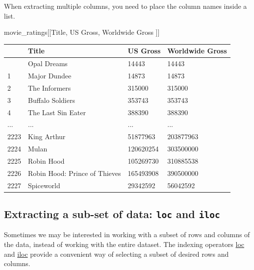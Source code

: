 \documentclass[
  letterpaper,
  DIV=11,
  numbers=noendperiod]{scrreprt}
\newenvironment{Shaded}{\begin{snugshade}}{\end{snugshade}}
\newcommand{\NormalTok}[1]{\textcolor[rgb]{0.00,0.23,0.31}{#1}}
\newcommand{\StringTok}[1]{\textcolor[rgb]{0.13,0.47,0.30}{#1}}
\begin{document}
When extracting multiple columns, you need to place the column names
inside a list.

\begin{Shaded}
\begin{Highlighting}[]
\NormalTok{movie\_ratings[[}\StringTok{\textquotesingle{}Title\textquotesingle{}}\NormalTok{, }\StringTok{\textquotesingle{}US Gross\textquotesingle{}}\NormalTok{, }\StringTok{\textquotesingle{}Worldwide Gross\textquotesingle{}}\NormalTok{ ]]}
\end{Highlighting}
\end{Shaded}

\begin{longtable}[]{@{}llll@{}}
\toprule\noalign{}
& Title & US Gross & Worldwide Gross \\
\midrule\noalign{}
\endhead
\bottomrule\noalign{}
\endlastfoot
0 & Opal Dreams & 14443 & 14443 \\
1 & Major Dundee & 14873 & 14873 \\
2 & The Informers & 315000 & 315000 \\
3 & Buffalo Soldiers & 353743 & 353743 \\
4 & The Last Sin Eater & 388390 & 388390 \\
... & ... & ... & ... \\
2223 & King Arthur & 51877963 & 203877963 \\
2224 & Mulan & 120620254 & 303500000 \\
2225 & Robin Hood & 105269730 & 310885538 \\
2226 & Robin Hood: Prince of Thieves & 165493908 & 390500000 \\
2227 & Spiceworld & 29342592 & 56042592 \\
\end{longtable}

\hypertarget{extracting-a-sub-set-of-data-loc-and-iloc}{%
\subsection{\texorpdfstring{Extracting a sub-set of data: \texttt{loc}
and
\texttt{iloc}}{Extracting a sub-set of data: loc and iloc}}\label{extracting-a-sub-set-of-data-loc-and-iloc}}

Sometimes we may be interested in working with a subset of rows and
columns of the data, instead of working with the entire dataset. The
indexing operators
\href{https://pandas.pydata.org/docs/reference/api/pandas.DataFrame.loc.html}{loc}
and
\href{https://pandas.pydata.org/docs/reference/api/pandas.DataFrame.iloc.html}{iloc}
provide a convenient way of selecting a subset of desired rows and
columns.
\end{document}
